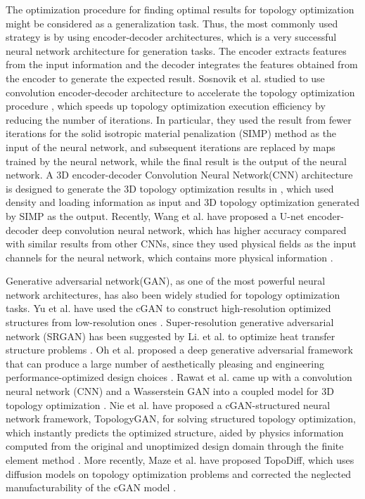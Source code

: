 \documentclass{article}
\begin{document}
The optimization procedure for finding optimal results for topology optimization might be considered as a generalization task. Thus,  the most commonly used strategy is by using encoder-decoder architectures, which is a very successful neural network architecture for generation tasks. The encoder extracts features from the input information and the decoder integrates the features obtained from the encoder to generate the expected result. Sosnovik et al. studied to use convolution 
encoder-decoder architecture to accelerate the topology optimization procedure \cite{6-1-sosnovik2019neural}, which speeds up topology optimization execution efficiency by reducing the number of iterations. In particular, they used the result from fewer iterations for the solid isotropic material penalization (SIMP) method as the input of the neural network, and  subsequent iterations are replaced by maps trained by the neural network, while the final result is the output of the neural network. A 3D encoder-decoder Convolution Neural Network(CNN) architecture is designed to generate the 3D topology optimization results in \cite{6-2-banga20183d}, which used density and loading information as input and 3D topology optimization generated by SIMP as the output. Recently, Wang et al. have proposed a U-net encoder-decoder deep convolution neural network, which has  higher accuracy compared with similar results from other CNNs, since they used physical fields as the input channels for the neural network, which contains more physical information \cite{3-TopoCNN-wang2022deep}. 

Generative adversarial network(GAN), as one of the most powerful neural network architectures, has also been widely studied for topology optimization tasks. Yu et al. have used the cGAN to construct high-resolution optimized structures from low-resolution ones \cite{6-5-yu2019deep}. Super-resolution generative adversarial network (SRGAN) has been suggested by Li. et al. to optimize heat transfer structure problems \cite{6-6-li2019non}. Oh et al. proposed a deep generative adversarial framework that can produce a large number of aesthetically pleasing and engineering performance-optimized design choices \cite{6-7-oh2019deep}. 
Rawat et al. came up with a convolution neural network (CNN) and a Wasserstein GAN into a coupled model for 3D topology optimization \cite{6-8-rawat2019application}. Nie et al. have proposed a cGAN-structured neural network framework, TopologyGAN, for solving structured topology optimization, which instantly predicts the optimized structure, aided by physics information computed from the original and unoptimized design domain through the finite element method \cite{1-TopoGAN-nie2021topologygan}. 
More recently, Maze et al. have proposed TopoDiff, which uses diffusion models on topology optimization problems and corrected the neglected manufacturability of the cGAN model \cite{6-9-maze2022diffusion}.\\
\end{document}
